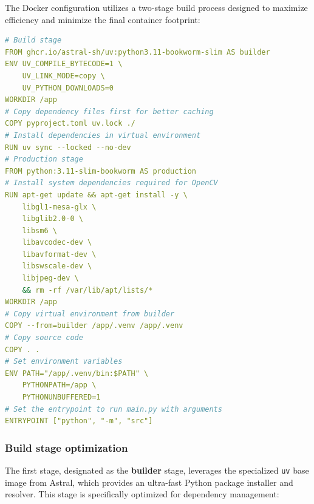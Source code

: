 The Docker configuration utilizes a two-stage build process designed to maximize efficiency and minimize the final container footprint:

\begin{lstlisting}[language=yaml, caption={Multi-stage Docker build configuration for edge deployment}]
# Build stage
FROM ghcr.io/astral-sh/uv:python3.11-bookworm-slim AS builder
ENV UV_COMPILE_BYTECODE=1 \
    UV_LINK_MODE=copy \
    UV_PYTHON_DOWNLOADS=0
WORKDIR /app
# Copy dependency files first for better caching
COPY pyproject.toml uv.lock ./
# Install dependencies in virtual environment
RUN uv sync --locked --no-dev
# Production stage
FROM python:3.11-slim-bookworm AS production
# Install system dependencies required for OpenCV
RUN apt-get update && apt-get install -y \
    libgl1-mesa-glx \
    libglib2.0-0 \
    libsm6 \
    libavcodec-dev \
    libavformat-dev \
    libswscale-dev \
    libjpeg-dev \
    && rm -rf /var/lib/apt/lists/*
WORKDIR /app
# Copy virtual environment from builder
COPY --from=builder /app/.venv /app/.venv
# Copy source code
COPY . .
# Set environment variables
ENV PATH="/app/.venv/bin:$PATH" \
    PYTHONPATH=/app \
    PYTHONUNBUFFERED=1
# Set the entrypoint to run main.py with arguments
ENTRYPOINT ["python", "-m", "src"]
\end{lstlisting}

\subsubsection{Build stage optimization}

The first stage, designated as the \textbf{builder} stage, leverages the specialized \texttt{uv} base image from Astral, which provides an ultra-fast Python package installer and resolver. This stage is specifically optimized for dependency management:

